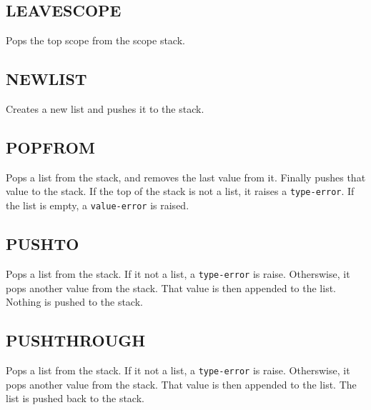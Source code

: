 \subsection{LEAVE\textunderscore{}SCOPE}
\label{sec:leavescope}
Pops the top scope from the scope stack.

\subsection{NEW\textunderscore{}LIST}
\label{sec:newlist}
Creates a new list and pushes it to the stack.

\subsection{POP\textunderscore{}FROM}
\label{sec:popfrom}
Pops a list from the stack, and removes the last value from it. Finally
pushes that value to the stack. If the top of the stack is not a list,
it raises a \verb!type-error!. If the list is empty, a
\verb!value-error! is raised.

\subsection{PUSH\textunderscore{}TO}
\label{sec:pushto}
Pops a list from the stack. If it not a list, a \verb!type-error! is
raise. Otherswise, it pops another value from the stack. That value
is then appended to the list. Nothing is pushed to the stack.

\subsection{PUSH\textunderscore{}THROUGH}
\label{sec:pushthrough}
Pops a list from the stack. If it not a list, a \verb!type-error! is
raise. Otherswise, it pops another value from the stack. That value
is then appended to the list. The list is pushed back to the stack.
